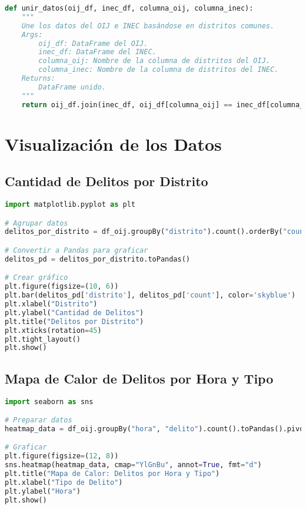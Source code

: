 \documentclass{article}
\begin{document}
\begin{lstlisting}[language=Python, caption={Función para unir datos del OIJ e INEC}]
def unir_datos(oij_df, inec_df, columna_oij, columna_inec):
    """
    Une los datos del OIJ e INEC basándose en distritos comunes.
    Args:
        oij_df: DataFrame del OIJ.
        inec_df: DataFrame del INEC.
        columna_oij: Nombre de la columna de distritos del OIJ.
        columna_inec: Nombre de la columna de distritos del INEC.
    Returns:
        DataFrame unido.
    """
    return oij_df.join(inec_df, oij_df[columna_oij] == inec_df[columna_inec])
\end{lstlisting}

\section{Visualización de los Datos}

\subsection{Cantidad de Delitos por Distrito}

\begin{lstlisting}[language=Python, caption={Visualización de delitos por distrito}]
import matplotlib.pyplot as plt

# Agrupar datos
delitos_por_distrito = df_oij.groupBy("distrito").count().orderBy("count", ascending=False).limit(10)

# Convertir a Pandas para graficar
delitos_pd = delitos_por_distrito.toPandas()

# Crear gráfico
plt.figure(figsize=(10, 6))
plt.bar(delitos_pd['distrito'], delitos_pd['count'], color='skyblue')
plt.xlabel("Distrito")
plt.ylabel("Cantidad de Delitos")
plt.title("Delitos por Distrito")
plt.xticks(rotation=45)
plt.tight_layout()
plt.show()
\end{lstlisting}

\subsection{Mapa de Calor de Delitos por Hora y Tipo}

\begin{lstlisting}[language=Python, caption={Mapa de calor de delitos por hora y tipo}]
import seaborn as sns

# Preparar datos
heatmap_data = df_oij.groupBy("hora", "delito").count().toPandas().pivot(index="hora", columns="delito", values="count").fillna(0)

# Graficar
plt.figure(figsize=(12, 8))
sns.heatmap(heatmap_data, cmap="YlGnBu", annot=True, fmt="d")
plt.title("Mapa de Calor: Delitos por Hora y Tipo")
plt.xlabel("Tipo de Delito")
plt.ylabel("Hora")
plt.show()
\end{lstlisting}
\end{document}
